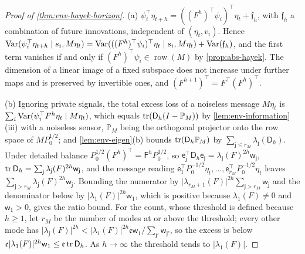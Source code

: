 \begin{proof}[Proof of \cref{thm:env-hayek-horizon}]
(a) $\psi_i^\top\eta_{t+h}=((F^h)^\top\psi_i)^\top\eta_t+\mathfrak f_h$, with $\mathfrak f_h$ a combination of future innovations, independent of $(\eta_t,v_i)$. Hence $\operatorname{Var}(\psi_i^\top\eta_{t+h}\mid s_i,M\eta_t)=\operatorname{Var}(((F^h)^\top\psi_i)^\top\eta_t\mid s_i,M\eta_t)+\operatorname{Var}(\mathfrak f_h)$, and the first term vanishes if and only if $(F^h)^\top\psi_i\in\operatorname{row}(M)$ by \cref{prop:abs-hayek}. The dimension of a linear image of a fixed subspace does not increase under further maps and is preserved by invertible ones, and $(F^{h+1})^\top=F^\top(F^h)^\top$.

(b) Ignoring private signals, the total excess loss of a noiseless message $M\eta_t$ is $\sum_i\operatorname{Var}(\psi_i^\top F^h\eta_t\mid M\eta_t)$, which equals $\operatorname{tr}(\mathsf D_h(I-\mathbb P_M))$ by \cref{lem:env-information}(iii) with a noiseless sensor, $\mathbb P_M$ being the orthogonal projector onto the row space of $MP_0^{1/2}$; and \cref{lem:env-eigen}(b) bounds $\operatorname{tr}(\mathsf D_h\mathbb P_M)$ by $\sum_{\mathsf j\le r_M}\lambda_{\mathsf j}(\mathsf D_h)$. Under detailed balance $P_0^{1/2}(F^h)^\top=\mathsf F^hP_0^{1/2}$, so $\mathsf e_{\mathsf j}^\top\mathsf D_h\mathsf e_{\mathsf j}=\lambda_{\mathsf j}(F)^{2h}\mathsf w_{\mathsf j}$, $\operatorname{tr}\mathsf D_h=\sum_{\mathsf j}\lambda_{\mathsf j}(F)^{2h}\mathsf w_{\mathsf j}$, and the message reading $\mathsf e_1^\top P_0^{-1/2}\eta_t,\dots,\mathsf e_{r_M}^\top P_0^{-1/2}\eta_t$ leaves $\sum_{\mathsf j>r_M}\lambda_{\mathsf j}(F)^{2h}\mathsf w_{\mathsf j}$. Bounding the numerator by $\lvert\lambda_{r_M+1}(F)\rvert^{2h}\sum_{\mathsf j>r_M}\mathsf w_{\mathsf j}$ and the denominator below by $\lvert\lambda_1(F)\rvert^{2h}\mathsf w_1$, which is positive because $\lambda_1(F)\ne0$ and $\mathsf w_1>0$, gives the ratio bound. For the count, whose threshold is defined because $h\ge1$, let $r_M$ be the number of modes at or above the threshold; every other mode has $\lvert\lambda_{\mathsf j}(F)\rvert^{2h}<\lvert\lambda_1(F)\rvert^{2h}\mathfrak e\mathsf w_1/\sum_{\mathsf j'}\mathsf w_{\mathsf j'}$, so the excess is below $\mathfrak e\lvert\lambda_1(F)\rvert^{2h}\mathsf w_1\le\mathfrak e\operatorname{tr}\mathsf D_h$. As $h\to\infty$ the threshold tends to $\lvert\lambda_1(F)\rvert$.


\end{proof}
